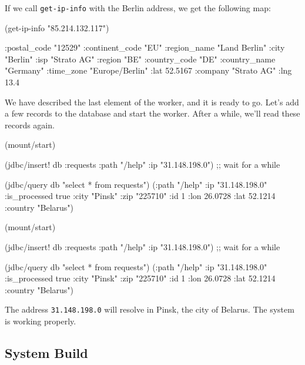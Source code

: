 \fi

\noindent
If we call \verb|get-ip-info| with the Berlin address, we get the following map:

\begin{english}
  \begin{clojure}
(get-ip-info "85.214.132.117")

{:postal_code "12529"
 :continent_code "EU"
 :region_name "Land Berlin"
 :city "Berlin"
 :isp "Strato AG"
 :region "BE"
 :country_code "DE"
 :country_name "Germany"
 :time_zone "Europe/Berlin"
 :lat 52.5167
 :company "Strato AG"
 :lng 13.4}
  \end{clojure}
\end{english}

We have described the last element of the worker, and it is ready to go. Let's add a few records to the database and start the worker. After a while, we'll read these records again.

\ifnarrow

\begin{english}
  \begin{clojure}
(mount/start)

(jdbc/insert! db :requests
  {:path "/help" :ip "31.148.198.0"})
;; wait for a while

(jdbc/query db "select * from requests")
({:path "/help"
  :ip "31.148.198.0"
  :is_processed true
  :city "Pinsk"
  :zip "225710" :id 1
  :lon 26.0728 :lat 52.1214
  :country "Belarus"})
  \end{clojure}
\end{english}

\else

\begin{english}
  \begin{clojure}
(mount/start)

(jdbc/insert! db :requests {:path "/help" :ip "31.148.198.0"})
;; wait for a while

(jdbc/query db "select * from requests")
({:path "/help" :ip "31.148.198.0" :is_processed true
  :city "Pinsk" :zip "225710" :id 1
  :lon 26.0728 :lat 52.1214 :country "Belarus"})
  \end{clojure}
\end{english}

\fi

The address \verb|31.148.198.0| will resolve in Pinsk, the city of Belarus. The system is working properly.

\subsection{System Build}


